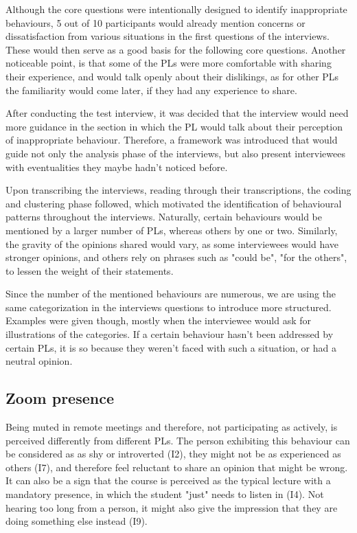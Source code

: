 Although the core questions were intentionally designed to identify inappropriate behaviours, 5 out of 10 participants would already mention concerns or dissatisfaction from various situations in the first questions of the interviews. These would then serve as a good basis for the following core questions. Another noticeable point, is that some of the PLs were more comfortable with sharing their experience, and would talk openly about their dislikings, as for other PLs the familiarity would come later, if they had any experience to share. 

After conducting the test interview, it was decided that the interview would need more guidance in the section in which the PL would talk about their perception of inappropriate behaviour. Therefore, a framework was introduced that would guide not only the analysis phase of the interviews, but also present interviewees with eventualities they maybe hadn't noticed before.

Upon transcribing the interviews, reading through their transcriptions, the coding and clustering phase followed, which motivated the identification of behavioural patterns throughout the interviews. Naturally, certain behaviours would be mentioned by a larger number of PLs, whereas others by one or two. Similarly, the gravity of the opinions shared would vary, as some interviewees would have stronger opinions, and others rely on phrases such as "could be", "for the others", to lessen the weight of their statements.

Since the number of the mentioned behaviours are numerous, we are using the same categorization in the interviews questions to introduce more structured.  Examples were given though, mostly when the interviewee would ask for illustrations of the categories. If a certain behaviour hasn't been addressed by certain PLs, it is so because they weren't faced with such a situation, or had a neutral opinion. 

\subsection{Zoom presence}

Being muted in remote meetings and therefore, not participating as actively, is perceived differently from different PLs. The person exhibiting this behaviour can be considered as as shy or introverted (I2), they might not be as experienced as others (I7), and therefore feel reluctant to share an opinion that might be wrong. It can also be a sign that the course is perceived as the typical lecture with a mandatory presence, in which the student "just" needs to listen in (I4). Not hearing too long from a person, it might also give the impression that they are doing something else instead (I9).

